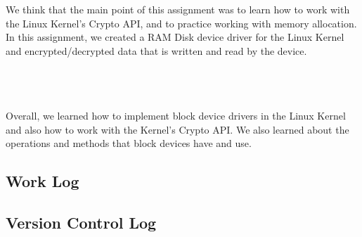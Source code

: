 \documentclass[journal, letterpaper, draftclsnofoot, onecolumn, 10pt]{IEEEtran}
\begin{document}
We think that the main point of this assignment was to learn how to work with the Linux Kernel's Crypto API, and to practice working with memory allocation.
In this assignment, we created a RAM Disk device driver for the Linux Kernel and encrypted/decrypted data that is written and read by the device.

 \\




 \\


 \\


Overall, we learned how to implement block device drivers in the Linux Kernel and also how to work with the Kernel's Crypto API.
We also learned about the operations and methods that block devices have and use.
 \\


\subsection{Work Log}




\clearpage
\subsection{Version Control Log}



\FloatBarrier



\scalebox{0.8}{
}


\FloatBarrier
\end{document}
